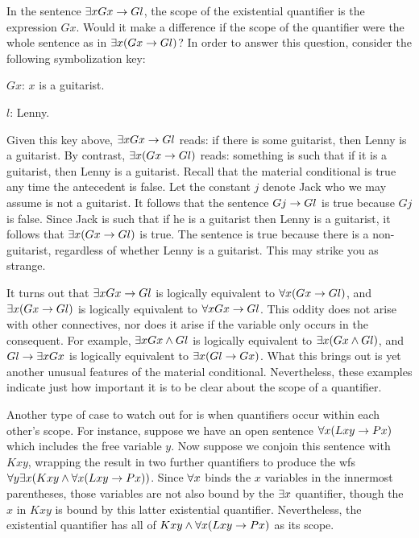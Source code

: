 In the sentence $\exists x Gx \rightarrow Gl$, the scope of the existential quantifier is the expression $Gx$.
Would it make a difference if the scope of the quantifier were the whole sentence as in $\exists x(Gx \rightarrow Gl)$?
In order to answer this question, consider the following symbolization key:

\begin{ekey}[leftmargin=.6in]
  \item[$Gx$:] $x$ is a guitarist.
  \item[$l$:] Lenny.
\end{ekey}

Given this key above, $\exists x Gx \rightarrow Gl$ reads: if there is some guitarist, then Lenny is a guitarist.
By contrast, $\exists x (Gx \rightarrow Gl)$ reads: something is such that if it is a guitarist, then Lenny is a guitarist.
Recall that the material conditional is true any time the antecedent is false.
Let the constant $j$ denote Jack who we may assume is not a guitarist.
It follows that the sentence $Gj \rightarrow Gl$ is true because $Gj$ is false.
Since Jack is such that if he is a guitarist then Lenny is a guitarist, it follows that $\exists x (Gx \rightarrow Gl)$ is true.
The sentence is true because there is a non-guitarist, regardless of whether Lenny is a guitarist.
This may strike you as strange.

It turns out that $\exists x Gx \rightarrow Gl$ is logically equivalent to $\forall x (Gx \rightarrow Gl)$, and $\exists x (Gx \rightarrow Gl)$ is logically equivalent to $\forall x Gx \rightarrow Gl$.
This oddity does not arise with other connectives, nor does it arise if the variable only occurs in the consequent.
For example, $\exists x Gx \wedge Gl$ is logically equivalent to $\exists x (Gx \wedge Gl)$, and $Gl \rightarrow \exists x Gx$ is logically equivalent to $\exists x(Gl \rightarrow Gx)$.
What this brings out is yet another unusual features of the material conditional.
Nevertheless, these examples indicate just how important it is to be clear about the scope of a quantifier.

Another type of case to watch out for is when quantifiers occur within each other's scope.
For instance, suppose we have an open sentence $\forall x(Lxy \rightarrow Px)$ which includes the free variable $y$. 
Now suppose we conjoin this sentence with $Kxy$, wrapping the result in two further quantifiers to produce the wfs $\forall y\exists x(Kxy \wedge \forall x(Lxy \rightarrow Px))$.
Since $\forall x$ binds the $x$ variables in the innermost parentheses, those variables are not also bound by the $\exists x$ quantifier, though the $x$ in $Kxy$ is bound by this latter existential quantifier.
Nevertheless, the existential quantifier has all of $Kxy \wedge \forall x(Lxy \rightarrow Px)$ as its scope.






